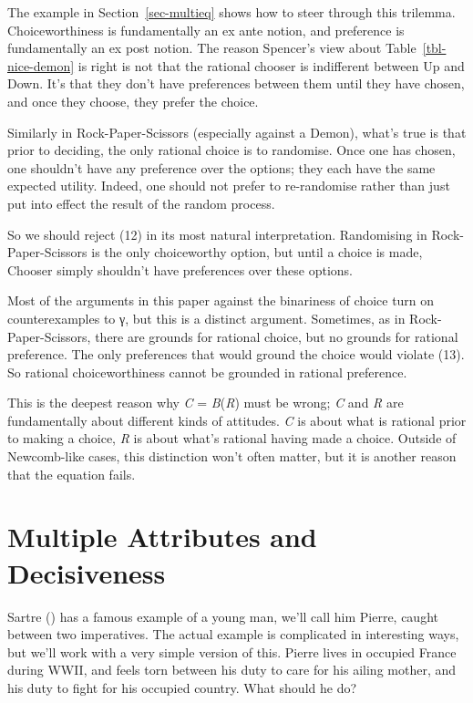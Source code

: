 \documentclass[
  11pt,
  letterpaper,
  DIV=11,
  numbers=noendperiod,
  twoside]{scrartcl}
\begin{document}
The example in Section~\ref{sec-multieq} shows how to steer through this
trilemma. Choiceworthiness is fundamentally an ex ante notion, and
preference is fundamentally an ex post notion. The reason Spencer's view
about Table~\ref{tbl-nice-demon} is right is not that the rational
chooser is indifferent between Up and Down. It's that they don't have
preferences between them until they have chosen, and once they choose,
they prefer the choice.

Similarly in Rock-Paper-Scissors (especially against a Demon), what's
true is that prior to deciding, the only rational choice is to
randomise. Once one has chosen, one shouldn't have any preference over
the options; they each have the same expected utility. Indeed, one
should not prefer to re-randomise rather than just put into effect the
result of the random process.

So we should reject (12) in its most natural interpretation. Randomising
in Rock-Paper-Scissors is the only choiceworthy option, but until a
choice is made, Chooser simply shouldn't have preferences over these
options.

Most of the arguments in this paper against the binariness of choice
turn on counterexamples to γ, but this is a distinct argument.
Sometimes, as in Rock-Paper-Scissors, there are grounds for rational
choice, but no grounds for rational preference. The only preferences
that would ground the choice would violate (13). So rational
choiceworthiness cannot be grounded in rational preference.

This is the deepest reason why \emph{C} = \emph{B}(\emph{R}) must be
wrong; \emph{C} and \emph{R} are fundamentally about different kinds of
attitudes. \emph{C} is about what is rational prior to making a choice,
\emph{R} is about what's rational having made a choice. Outside of
Newcomb-like cases, this distinction won't often matter, but it is
another reason that the equation fails.

\section{Multiple Attributes and Decisiveness}\label{sec-sartre}

Sartre () has a famous example of a
young man, we'll call him Pierre, caught between two imperatives. The
actual example is complicated in interesting ways, but we'll work with a
very simple version of this. Pierre lives in occupied France during
WWII, and feels torn between his duty to care for his ailing mother, and
his duty to fight for his occupied country. What should he do?
\end{document}
